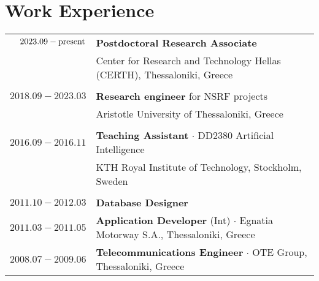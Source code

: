 \documentclass[a4paper,10pt,twoside]{article}
\begin{document}


\par{\bigskip\par}



\section{Work Experience}

\begin{tabular}{rp{12cm}}
$2023.09 - \hfill \textnormal{present} \hfill$ & \textbf{Postdoctoral Research Associate} \\
                    & Center for Research and Technology Hellas (CERTH), Thessaloniki, Greece\\
&\\
$2018.09 - 2023.03$ & \textbf{Research engineer} for NSRF projects\\
                    & Aristotle University of Thessaloniki, Greece\\
&\\
$2016.09 - 2016.11$ & \textbf{Teaching Assistant} $\cdot$ DD2380 Artificial Intelligence\\
                    & KTH Royal Institute of Technology, Stockholm, Sweden\\
&\\
$2011.10 - 2012.03$ & \textbf{Database Designer}\\
$2011.03 - 2011.05$ & \textbf{Application Developer} (Int) $\cdot$ Egnatia Motorway S.A., Thessaloniki, Greece\\
$2008.07 - 2009.06$ & \textbf{Telecommunications Engineer} $\cdot$ OTE Group, Thessaloniki, Greece\\
\end{tabular} \\
\end{document}
